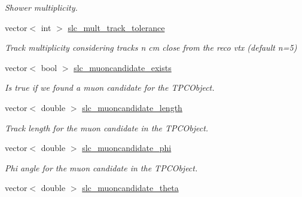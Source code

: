\begin{DoxyCompactItemize}
\begin{DoxyCompactList}\small\item\em Shower multiplicity. \end{DoxyCompactList}\item 
\hypertarget{classUBXSecEvent_ab49b7199fe07b6ed85017048b685d7bb}{vector$<$ int $>$ \hyperlink{classUBXSecEvent_ab49b7199fe07b6ed85017048b685d7bb}{slc\-\_\-mult\-\_\-track\-\_\-tolerance}}\label{classUBXSecEvent_ab49b7199fe07b6ed85017048b685d7bb}

\begin{DoxyCompactList}\small\item\em Track multiplicity considering tracks n cm close from the reco vtx (default n=5) \end{DoxyCompactList}\item 
\hypertarget{classUBXSecEvent_a77d7addc1e52f51c7697daab275c8bc6}{vector$<$ bool $>$ \hyperlink{classUBXSecEvent_a77d7addc1e52f51c7697daab275c8bc6}{slc\-\_\-muoncandidate\-\_\-exists}}\label{classUBXSecEvent_a77d7addc1e52f51c7697daab275c8bc6}

\begin{DoxyCompactList}\small\item\em Is true if we found a muon candidate for the T\-P\-C\-Object. \end{DoxyCompactList}\item 
\hypertarget{classUBXSecEvent_aed08b3fea158e50f1f878bb211e7abb6}{vector$<$ double $>$ \hyperlink{classUBXSecEvent_aed08b3fea158e50f1f878bb211e7abb6}{slc\-\_\-muoncandidate\-\_\-length}}\label{classUBXSecEvent_aed08b3fea158e50f1f878bb211e7abb6}

\begin{DoxyCompactList}\small\item\em Track length for the muon candidate in the T\-P\-C\-Object. \end{DoxyCompactList}\item 
\hypertarget{classUBXSecEvent_a99414e0a0e74aaeac78fa019f53f4760}{vector$<$ double $>$ \hyperlink{classUBXSecEvent_a99414e0a0e74aaeac78fa019f53f4760}{slc\-\_\-muoncandidate\-\_\-phi}}\label{classUBXSecEvent_a99414e0a0e74aaeac78fa019f53f4760}

\begin{DoxyCompactList}\small\item\em Phi angle for the muon candidate in the T\-P\-C\-Object. \end{DoxyCompactList}\item 
\hypertarget{classUBXSecEvent_a8b3d8a8475d7c283fad2d1d4e6a85dca}{vector$<$ double $>$ \hyperlink{classUBXSecEvent_a8b3d8a8475d7c283fad2d1d4e6a85dca}{slc\-\_\-muoncandidate\-\_\-theta}}\label{classUBXSecEvent_a8b3d8a8475d7c283fad2d1d4e6a85dca}


\end{DoxyCompactItemize}
